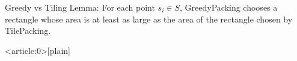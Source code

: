 \begin{frame}{Greedy vs Tiling}
	Lemma: For each point $s_i \in S$, GreedyPacking chooses a rectangle whose area is at least as large as the area of the rectangle chosen by TilePacking.
\end{frame}

{ %
    \begin{frame}<article:0>[plain]
     \end{frame}
}